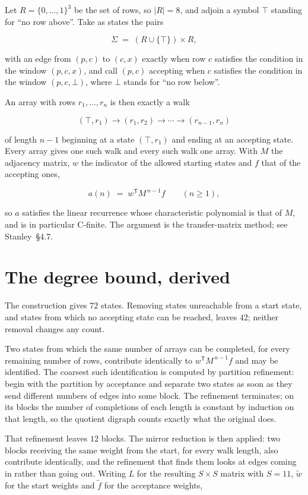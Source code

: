 \documentclass[11pt]{article}
\theoremstyle{definition}
\begin{document}
Let $R = \{0,\dots,1\}^{3}$ be the set of rows, so $|R| = 8$, and adjoin a symbol $\top$ standing for ``no row above''. Take as states the pairs

\[\Sigma \;=\; (R \cup \{\top\}) \times R,\]

with an edge from $(p,c)$ to $(c,x)$ exactly when row $c$ satisfies the condition in the window $(p,c,x)$, and call $(p,c)$ accepting when $c$ satisfies the condition in the window $(p,c,\bot)$, where $\bot$ stands for ``no row below''.

An array with rows $r_1,\dots,r_n$ is then exactly a walk

\[(\top,r_1) \to (r_1,r_2) \to \cdots \to (r_{n-1},r_n)\]

of length $n-1$ beginning at a state $(\top,r_1)$ and ending at an accepting state. Every array gives one such walk and every such walk one array. With $M$ the adjacency matrix, $w$ the indicator of the allowed starting states and $f$ that of the accepting ones,

\[a(n) \;=\; w^{\mathsf T} M^{\,n-1} f \qquad (n \ge 1),\]

so $a$ satisfies the linear recurrence whose characteristic polynomial is that of $M$, and is in particular C-finite. The argument is the transfer-matrix method; see Stanley~\S4.7.

\section{The degree bound, derived}

The construction gives $72$ states. Removing states unreachable from a start state, and states from which no accepting state can be reached, leaves $42$; neither removal changes any count.

Two states from which the same number of arrays can be completed, for every remaining number of rows, contribute identically to $w^{\mathsf T}M^{\,n-1}f$ and may be identified. The coarsest such identification is computed by partition refinement: begin with the partition by acceptance and separate two states as soon as they send different numbers of edges into some block. The refinement terminates; on its blocks the number of completions of each length is constant by induction on that length, so the quotient digraph counts exactly what the original does.

That refinement leaves $12$ blocks. The mirror reduction is then applied: two blocks receiving the same weight from the start, for every walk length, also contribute identically, and the refinement that finds them looks at edges coming in rather than going out. Writing $L$ for the resulting $S \times S$ matrix with $S = 11$, $\tilde w$ for the start weights and $\tilde f$ for the acceptance weights,
\end{document}
